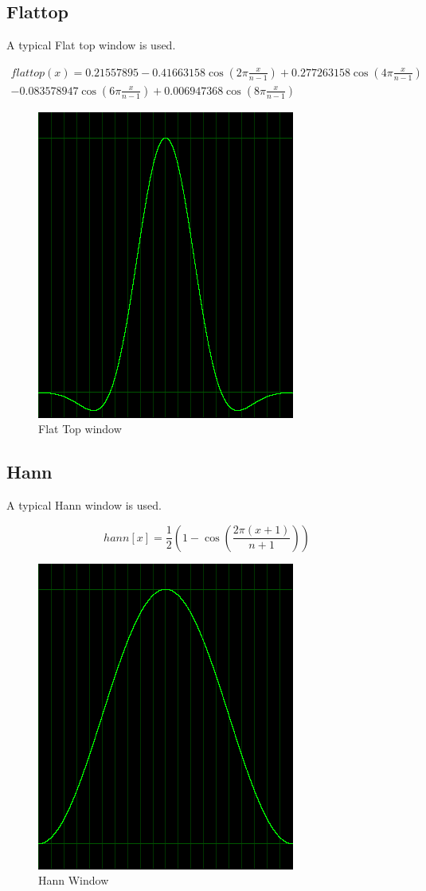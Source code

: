 \documentclass[10pt,a4paper]{report}
\begin{document}
\subsection{Flattop}
A typical Flat top window is used.

\begin{align*}
flattop(x)=0.21557895 - 0.41663158\cos(2\pi\frac{x}{n-1})+ 0.277263158\cos(4\pi\frac{x}{n-1})\\
 - 0.083578947\cos(6\pi\frac{x}{n-1}) + 0.006947368\cos(8\pi\frac{x}{n-1})
\end{align*}

\begin{figure}[H]
	\centering
	\includegraphics[width=0.4\linewidth]{plots/window-flattop.png}
	\caption[Flat Top window]{Flat Top window}
	\label{fig:window-flattop}
\end{figure}


\subsection{Hann}
A typical Hann window is used.

\begin{equation}
hann[x] = \frac{1}{2}(1 - \cos(\frac{2\pi(x+1)}{n+1}))
\end{equation}

\begin{figure}[H]
	\centering
	\includegraphics[width=0.4\linewidth]{plots/window-hann.png}
	\caption[Hann Window]{Hann Window}
	\label{fig:window-hann}
\end{figure}
\end{document}
